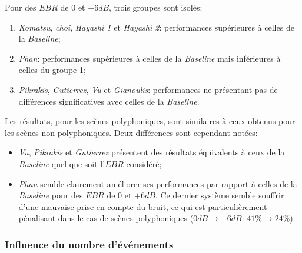 Pour des $EBR$ de $0$ et $-6dB$, trois groupes sont isolés: 

\begin{enumerate}
\item \emph{Komatsu}, \emph{choi}, \emph{Hayashi 1} et \emph{Hayashi 2}: performances supérieures à celles de la \emph{Baseline};
\item \emph{Phan}: performances supérieures à celles de la \emph{Baseline} mais inférieures à celles du groupe 1;
\item \emph{Pikrakis}, \emph{Gutierrez}, \emph{Vu} et \emph{Gianoulis}: performances ne présentant pas de différences significatives avec celles de la \emph{Baseline}.
\end{enumerate}

Les résultats, pour les scènes polyphoniques, sont similaires à ceux obtenus pour les scènes non-polyphoniques. Deux différences sont cependant notées:

\begin{itemize}
\item  \emph{Vu}, \emph{Pikrakis} et \emph{Gutierrez} présentent des résultats équivalents à ceux de la \emph{Baseline} quel que soit l'$EBR$ considéré;
\item  \emph{Phan} semble clairement améliorer ses performances par rapport à celles de la \emph{Baseline} pour des $EBR$ de $0$ et $+6dB$. Ce dernier système semble souffrir d'une mauvaise prise en compte du bruit, ce qui est particulièrement pénalisant dans le cas de scènes polyphoniques ($0dB\rightarrow -6dB$: $41\%\rightarrow 24\%$).
\end{itemize}

\subsubsection{Influence du nombre d'événements}

